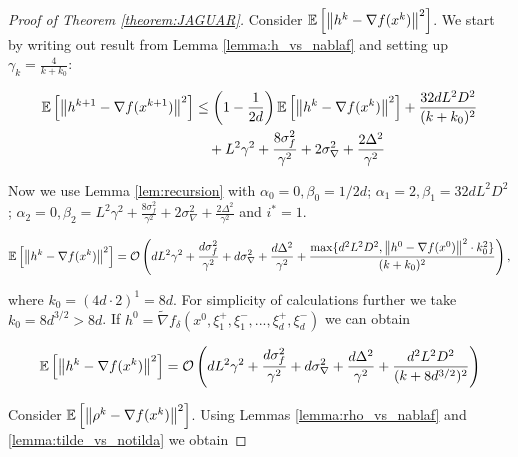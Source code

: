     \begin{proof}[Proof of Theorem \ref{theorem:JAGUAR}]
        Consider $\mathbb{E}\left[ \left\| h^{k} - \nabla f(x^{k}) \right\|^2 \right]$. We start by writing out result from Lemma \ref{lemma:h_vs_nablaf} and setting up $\gamma_k = \frac{4}{k + k_0}$:

        \begin{equation*}
        \begin{split}
            \mathbb{E}\left[ \left\| h^{k+1} - \nabla f(x^{k+1}) \right\|^2 \right]
            &\leq
            \left(1 - \frac{1}{2 d}\right) \mathbb{E}\left[ \left\| h^{k} - \nabla f(x^{k}) \right\|^2 \right]
            + \frac{32 d L^2 D^2}{(k + k_0)^2} 
            \\&\quad+ L^2 \gamma^2 
            + \frac{8 \sigma_f^2}{\gamma^2} 
            + 2 \sigma_{\nabla}^2 + \frac{2 \Delta^2}{\gamma^2}
        \end{split}
        \end{equation*}

        Now we use Lemma \ref{lem:recursion} with $\alpha_0 = 0, \beta_0 = 1/2d$;
        $\alpha_1 = 2, \beta_1 = 32d L^2 D^2$;
        $\alpha_2 = 0, \beta_2 = L^2 \gamma^2 + \frac{8 \sigma_f^2}{\gamma^2} + 2 \sigma_{\nabla}^2 + \frac{2 \Delta^2}{\gamma^2}$ and $i^* = 1$.

        \begin{equation*}
            \mathbb{E}\left[ \left\| h^{k} - \nabla f(x^{k}) \right\|^2 \right] = 
            \mathcal{O} \left( d L^2 \gamma^2 
            + \frac{d \sigma_f^2}{\gamma^2} 
            + d \sigma_{\nabla}^2 + \frac{d \Delta^2}{\gamma^2}
            +\frac{\max\{d^2 L^2 D^2, \left\| h^0 - \nabla f(x^0) \right\|^2 \cdot k_0^2\}}{(k + k_0)^2} \right),
        \end{equation*}

        where $k_0 = (4d \cdot 2)^1 = 8d$. For simplicity of calculations further we take $k_0 = 8 d^{3/2} > 8d$. If $h^0 = \widetilde{\nabla} f_\delta(x^0, \xi^+_1, \xi^-_1, ..., \xi^+_d, \xi^-_d)$ we can obtain

        \begin{equation*}
            \mathbb{E}\left[ \left\| h^{k} - \nabla f(x^{k}) \right\|^2 \right] = 
            \mathcal{O} \left( d L^2 \gamma^2 
            + \frac{d \sigma_f^2}{\gamma^2} 
            + d \sigma_{\nabla}^2 + \frac{d \Delta^2}{\gamma^2}
            +\frac{d^2 L^2 D^2}{(k + 8d^{3/2})^2} \right)
        \end{equation*}

        Consider $\mathbb{E}\left[ \left\| \rho^{k} - \nabla f(x^{k}) \right\|^2 \right]$. Using Lemmas \ref{lemma:rho_vs_nablaf} and \ref{lemma:tilde_vs_notilda} we obtain


\end{proof}

